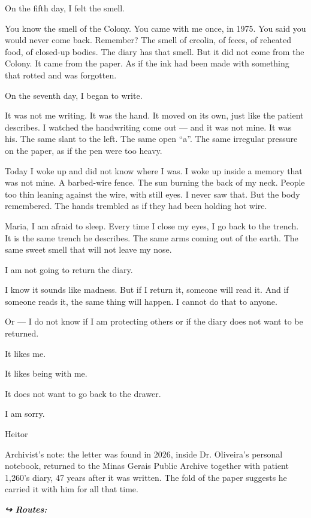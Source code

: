 \noindent On the fifth day, I felt the smell.

\noindent You know the smell of the Colony. You came with me once, in 1975.
\noindent You said you would never come back. Remember? The smell of creolin, of feces, of
\noindent reheated food, of closed-up bodies. The diary has that smell. But it did not come
\noindent from the Colony. It came from the paper. As if the ink had been made with
\noindent something that rotted and was forgotten.

\noindent On the seventh day, I began to write.

\noindent It was not me writing. It was the hand. It moved on its own, just like the
\noindent patient describes. I watched the handwriting come out --- and it was not mine. It was
\noindent his. The same slant to the left. The same open \textquotedblleft{}a\textquotedblright{}. The same
\noindent irregular pressure on the paper, as if the pen were too heavy.

\noindent Today I woke up and did not know where I was. I woke up inside a
\noindent memory that was not mine. A barbed-wire fence. The sun burning
\noindent the back of my neck. People too thin leaning against the wire, with still eyes. I
\noindent never saw that. But the body remembered. The hands trembled as if they had been
\noindent holding hot wire.

\noindent Maria, I am afraid to sleep. Every time I close my eyes, I
\noindent go back to the trench. It is the same trench he describes. The same arms coming out
\noindent of the earth. The same sweet smell that will not leave my nose.

\noindent I am not going to return the diary.

\noindent I know it sounds like madness. But if I return it, someone will read it. And if
\noindent someone reads it, the same thing will happen. I cannot do that to
\noindent anyone.

\noindent Or --- I do not know if I am protecting others or if the diary does not
\noindent want to be returned.

\noindent It likes me.

\noindent It likes being with me.

\noindent It does not want to go back to the drawer.

\noindent I am sorry.

\noindent Heitor

\noindent Archivist's note: the letter was found in 2026, inside Dr. Oliveira's personal notebook, returned to the Minas Gerais Public Archive together with patient 1,260's diary, 47 years after it was written. The fold of the paper suggests he carried it with him for all that time.

\vspace{0.5em}
\noindent\textit{\textbf{↪ Routes:}  \rotasep {} \rotasep {}}
